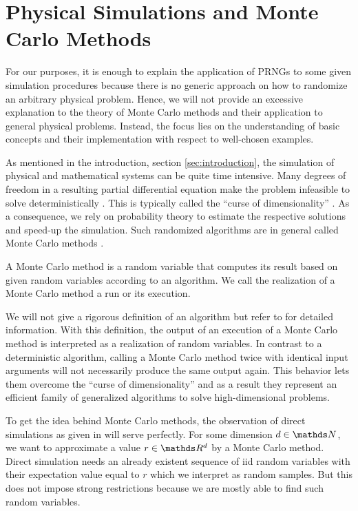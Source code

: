 \documentclass{stdlocal}
\begin{document}
\section{Physical Simulations and Monte Carlo Methods} %
\label{sub:simulation_in_physics_and_mathematics}
  For our purposes, it is enough to explain the application of PRNGs to some given simulation procedures because there is no generic approach on how to randomize an arbitrary physical problem.
  Hence, we will not provide an excessive explanation to the theory of Monte Carlo methods and their application to general physical problems.
  Instead, the focus lies on the understanding of basic concepts and their implementation with respect to well-chosen examples.

  As mentioned in the introduction, section \ref{sec:introduction}, the simulation of physical and mathematical systems can be quite time intensive.
  Many degrees of freedom in a resulting partial differential equation make the problem infeasible to solve deterministically \autocite{landau2014}.
  This is typically called the \enquote{curse of dimensionality} \autocite{mueller2012}.
  As a consequence, we rely on probability theory to estimate the respective solutions and speed-up the simulation.
  Such randomized algorithms are in general called Monte Carlo methods \autocite{mueller2012,landau2014}.

  \begin{definition}[Monte Carlo Method]
    A Monte Carlo method is a random variable that computes its result based on given random variables according to an algorithm.
    We call the realization of a Monte Carlo method a run or its execution.
  \end{definition}
  We will not give a rigorous definition of an algorithm but refer to \textcite{hromkovic2011} for detailed information.
  With this definition, the output of an execution of a Monte Carlo method is interpreted as a realization of random variables.
  In contrast to a deterministic algorithm, calling a Monte Carlo method twice with identical input arguments will not necessarily produce the same output again.
  This behavior lets them overcome the \enquote{curse of dimensionality} and as a result they represent an efficient family of generalized algorithms to solve high-dimensional problems.

  To get the idea behind Monte Carlo methods, the observation of direct simulations as given in \textcite{mueller2012} will serve perfectly.
  For some dimension $d\in\setNatural$, we want to approximate a value $r\in\setReal^d$ by a Monte Carlo method.
  Direct simulation needs an already existent sequence of iid random variables with their expectation value equal to $r$ which we interpret as random samples.
  But this does not impose strong restrictions because we are mostly able to find such random variables.
\end{document}
